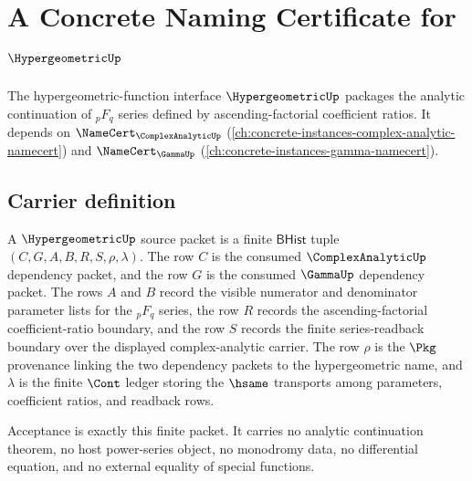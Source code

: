 \chapter{A Concrete Naming Certificate for $\HypergeometricUp$}
\label{ch:concrete-instances-hypergeometric-namecert}

The hypergeometric-function interface $\HypergeometricUp$ packages the analytic continuation of $_pF_q$ series defined by ascending-factorial coefficient ratios. It depends on $\NameCert_{\ComplexAnalyticUp}$ (\autoref{ch:concrete-instances-complex-analytic-namecert}) and $\NameCert_{\GammaUp}$ (\autoref{ch:concrete-instances-gamma-namecert}).

\section{Carrier definition}
\label{sec:hypergeometric-carrier}

\begin{definition}
\label{def:hypergeometric-bhist-source-packet}
A $\HypergeometricUp$ source packet is a finite $\mathsf{BHist}$ tuple
$(C,G,A,B,R,S,\rho,\lambda)$. The row $C$ is the consumed
$\ComplexAnalyticUp$ dependency packet, and the row $G$ is the consumed
$\GammaUp$ dependency packet. The rows $A$ and $B$ record the visible numerator
and denominator parameter lists for the $_pF_q$ series, the row $R$ records the
ascending-factorial coefficient-ratio boundary, and the row $S$ records the
finite series-readback boundary over the displayed complex-analytic carrier.
The row $\rho$ is the $\Pkg$ provenance linking the two dependency packets to
the hypergeometric name, and $\lambda$ is the finite $\Cont$ ledger storing the
$\hsame$ transports among parameters, coefficient ratios, and readback rows.

Acceptance is exactly this finite packet. It carries no analytic continuation
theorem, no host power-series object, no monodromy data, no differential
equation, and no external equality of special functions.
\end{definition}

